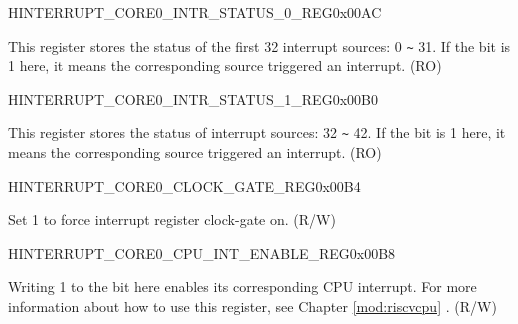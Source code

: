 \begin{register}{H}{INTERRUPT\_CORE0\_INTR\_STATUS\_0\_REG}{0x00AC}\label{regdesc:INTERRUPTCORE0INTRSTATUS0REG}
%
\regnewline%
\begin{regdesc}\begin{reglist}
\label{fielddesc:INTERRUPTCORE0INTRSTATUS0}\item [INTERRUPT\_CORE0\_INTR\_STATUS\_0] This register stores the status of the first 32 interrupt sources: 0 \verb+~+ 31. If the bit is 1 here, it means the corresponding source triggered an interrupt. (RO)
\end{reglist}\end{regdesc}
\end{register}


\begin{register}{H}{INTERRUPT\_CORE0\_INTR\_STATUS\_1\_REG}{0x00B0}\label{regdesc:INTERRUPTCORE0INTRSTATUS1REG}
%
\regnewline%
\begin{regdesc}\begin{reglist}
\label{fielddesc:INTERRUPTCORE0INTRSTATUS1}\item [INTERRUPT\_CORE0\_INTR\_STATUS\_1] This register stores the status of interrupt sources: 32 \verb+~+ 42. If the bit is 1 here, it means the corresponding source triggered an interrupt. (RO)
\end{reglist}\end{regdesc}
\end{register}


\begin{register}{H}{INTERRUPT\_CORE0\_CLOCK\_GATE\_REG}{0x00B4}\label{regdesc:INTERRUPTCORE0CLOCKGATEREG}
%
%
\regnewline%
\begin{regdesc}\begin{reglist}
\label{fielddesc:INTERRUPTCORE0CLKEN}\item [INTERRUPT\_CORE0\_CLK\_EN] Set 1 to force interrupt register clock-gate on. (R/W)
\end{reglist}\end{regdesc}
\end{register}


\begin{register}{H}{INTERRUPT\_CORE0\_CPU\_INT\_ENABLE\_REG}{0x00B8}\label{regdesc:INTERRUPTCORE0CPUINTENABLEREG}
%
\regnewline%
\begin{regdesc}\begin{reglist}
\label{fielddesc:INTERRUPTCORE0CPUINTENABLE}\item [INTERRUPT\_CORE0\_CPU\_INT\_ENABLE] Writing 1 to the bit here enables its corresponding CPU interrupt. For more information about how to use this register, see Chapter \ref{mod:riscvcpu} \textit{}. (R/W)
\end{reglist}\end{regdesc}
\end{register}


